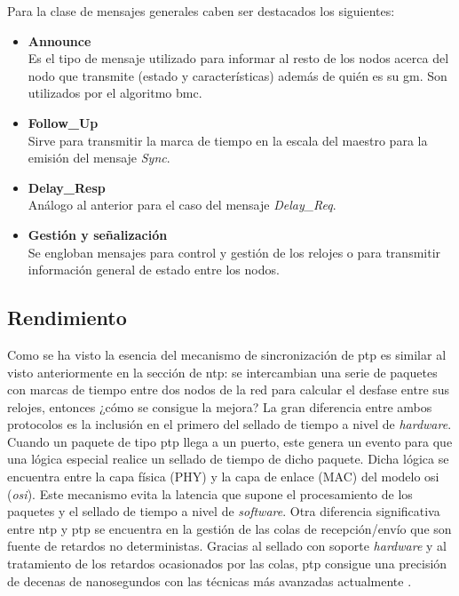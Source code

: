 Para la clase de mensajes generales caben ser destacados los siguientes:

\begin{itemize}
	\item \textbf{Announce} \\
	Es el tipo de mensaje utilizado para informar al resto de los nodos acerca 
	del nodo que transmite (estado y características) además de quién es su 
	\gls{gm}. Son utilizados por el algoritmo \gls{bmc}.
	
	\item \textbf{Follow\_Up} \\
	Sirve para transmitir la marca de tiempo en la escala del maestro para la 
	emisión del mensaje \textit{Sync}.
	
	\item \textbf{Delay\_Resp} \\
	Análogo al anterior para el caso del mensaje \textit{Delay\_Req}.
	
	\item \textbf{Gestión y señalización} \\
	Se engloban mensajes para control y gestión de los relojes o para 
	transmitir información general de estado entre los nodos.
	
\end{itemize}


\subsection{Rendimiento}

Como se ha visto la esencia del mecanismo de sincronización de \gls{ptp} es 
similar al visto anteriormente en la sección de \gls{ntp}: se intercambian una 
serie de paquetes con marcas de tiempo entre dos nodos de la red para calcular 
el desfase entre sus relojes, entonces ¿cómo se consigue la mejora? La gran 
diferencia entre ambos protocolos es la inclusión en el primero del sellado de 
tiempo a nivel de \textit{hardware}. Cuando un paquete de tipo \gls{ptp} llega 
a un puerto, este genera un evento para que una lógica especial realice un 
sellado de tiempo de dicho paquete. Dicha lógica se encuentra entre la capa 
física (PHY) y la capa de enlace (MAC) del modelo \acrshort{osi} 
(\textit{\acrlong{osi}}). Este mecanismo evita la latencia que supone el 
procesamiento de los paquetes y el sellado de tiempo a nivel de 
\textit{software}. Otra diferencia significativa entre \gls{ntp} y \gls{ptp} se 
encuentra en la gestión de las colas de recepción/envío que son fuente de 
retardos no deterministas. Gracias al sellado con soporte \textit{hardware} y 
al tratamiento de los retardos ocasionados por las colas, \gls{ptp} consigue 
una precisión de decenas de nanosegundos con las técnicas más avanzadas 
actualmente \cite{5340221}.




